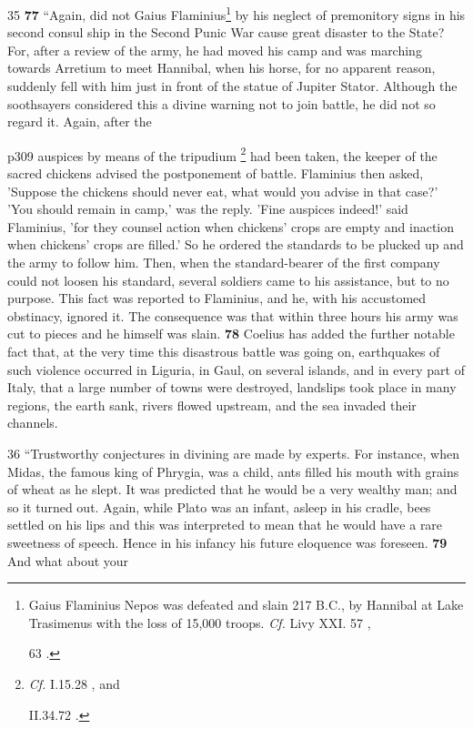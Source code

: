 35
\textbf{77} ``Again, did not Gaius Flaminius\texthebrew{}\footnote{Gaius Flaminius Nepos was defeated and slain 217 B.C., by Hannibal at Lake Trasimenus with the loss of 15,000 troops. \emph{Cf.} Livy XXI. 57 ,

63 .

} by his neglect of premonitory signs in his second consul ­ship in the Second Punic War cause great disaster to the State? For, after a review of the army, he had moved his camp and was marching towards Arretium to meet Hannibal, when his horse, for no apparent reason, suddenly fell with him just in front of the statue of Jupiter Stator. Although the soothsayers considered this a divine warning not to join battle, he did not so regard it. Again, after the

p309 auspices by means of the tripudium \texthebrew{}\footnote{\emph{Cf.} I.15.28 , and

II.34.72 .

} had been taken, the keeper of the sacred chickens advised the postponement of battle. Flaminius then asked, 'Suppose the chickens should never eat, what would you advise in that case?' 'You should remain in camp,' was the reply. 'Fine auspices indeed!' said Flaminius, 'for they counsel action when chickens' crops are empty and inaction when chickens' crops are filled.' So he ordered the standards to be plucked up and the army to follow him. Then, when the standard-bearer of the first company could not loosen his standard, several soldiers came to his assistance, but to no purpose. This fact was reported to Flaminius, and he, with his accustomed obstinacy, ignored it. The consequence was that within three hours his army was cut to pieces and he himself was slain. \textbf{78} Coelius has added the further notable fact that, at the very time this disastrous battle was going on, earthquakes of such violence occurred in Liguria, in Gaul, on several islands, and in every part of Italy, that a large number of towns were destroyed, landslips took place in many regions, the earth sank, rivers flowed upstream, and the sea invaded their channels.

36
``Trustworthy conjectures in divining are made by experts. For instance, when Midas, the famous king of Phrygia, was a child, ants filled his mouth with grains of wheat as he slept. It was predicted that he would be a very wealthy man; and so it turned out. Again, while Plato was an infant, asleep in his cradle, bees settled on his lips and this was interpreted to mean that he would have a rare sweetness of speech. Hence in his infancy his future eloquence was foreseen. \textbf{79} And what about your

